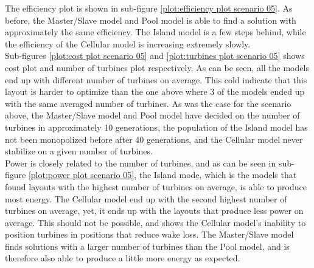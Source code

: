 \noindent The efficiency plot is shown in sub-figure \ref{plot:efficiency plot scenario 05}. As before, the Master/Slave model and Pool model is able to find a solution with approximately the same efficiency. The Island model is a few steps behind, while the efficiency of the Cellular model is increasing extremely slowly. \\

\noindent Sub-figures \ref{plot:cost plot scenario 05} and \ref{plot:turbines plot scenario 05} shows cost plot and number of turbines plot respectively. As can be seen, all the models end up with different number of turbines on average. This cold indicate that this layout is harder to optimize than the one above where 3 of the models ended up with the same averaged number of turbines. As was the case for the scenario above, the Master/Slave model and Pool model have decided on the number of turbines in approximately 10 generations, the population of the Island model has not been monopolized before after 40 generations, and the Cellular model never stabilize on a given number of turbines.\\

\noindent Power is closely related to the number of turbines, and as can be seen in sub-figure \ref{plot:power plot scenario 05}, the Island mode, which is the models that found layouts with the highest number of turbines on average, is able to produce most energy. The Cellular model end up with the second highest number of turbines on average, yet, it ends up with the layouts that produce less power on average. This should not be possible, and shows the Cellular model's inability to position turbines in positions that reduce wake loss. The Master/Slave model finds solutions with a larger number of turbines than the Pool model, and is therefore also able to produce a little more energy as expected.\\

